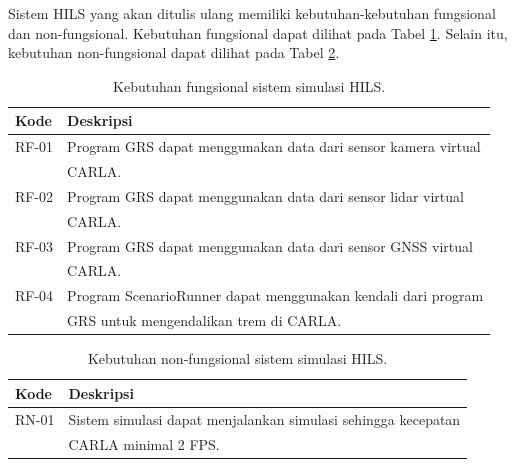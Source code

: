 Sistem HILS yang akan ditulis ulang memiliki kebutuhan-kebutuhan fungsional dan
non-fungsional. Kebutuhan fungsional dapat dilihat pada Tabel
\ref{chapter-3-tbl-functional-requirement}. Selain itu, kebutuhan non-fungsional
dapat dilihat pada Tabel \ref{chapter-3-tbl-non-functional-requirement}.
\begin{table}[!htbp]
	\centering
	\begin{tabular}{|l|l|}
		\hline
		\textbf{Kode} & \textbf{Deskripsi}                                            \\
		\hline
		RF-01         & Program GRS dapat menggunakan data dari sensor kamera virtual \\
		              & CARLA.                                                        \\
		\hline
		RF-02         & Program GRS dapat menggunakan data dari sensor lidar virtual  \\
		              & CARLA.                                                        \\
		\hline
		RF-03         & Program GRS dapat menggunakan data dari sensor GNSS virtual   \\
		              & CARLA.                                                        \\
		\hline
		RF-04         & Program ScenarioRunner dapat menggunakan kendali dari program \\
		              & GRS untuk mengendalikan trem di CARLA.                        \\
		\hline
	\end{tabular}
	\label{chapter-3-tbl-functional-requirement}
	\caption{Kebutuhan fungsional sistem simulasi HILS.}
\end{table}

\begin{table}[!htbp]
	\centering
	\begin{tabular}{|l|l|}
		\hline
		\textbf{Kode} & \textbf{Deskripsi}                                            \\
		\hline
		RN-01         & Sistem simulasi dapat menjalankan simulasi sehingga kecepatan \\
		              & CARLA minimal 2 FPS.                                          \\
		\hline
	\end{tabular}
	\label{chapter-3-tbl-non-functional-requirement}
	\caption{Kebutuhan non-fungsional sistem simulasi HILS.}
\end{table}

